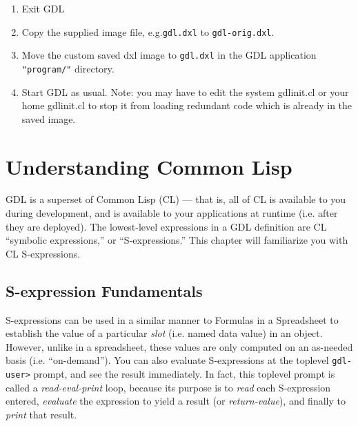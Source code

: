 \documentclass [11pt]{book}
\begin{document}
\begin{enumerate}

\item Exit GDL

\item Copy the supplied image file, e.g.\texttt{gdl.dxl} to \texttt{gdl-orig.dxl}.

\item Move the custom saved dxl image to \texttt{gdl.dxl} in the GDL application \texttt{"program/"} directory.

\item Start GDL as usual. Note: you may have to edit the system gdlinit.cl or your home gdlinit.cl
to stop it from loading redundant code which is already in the saved image.

\end{enumerate}



\chapter{Understanding Common Lisp}

\label{chap:understandingcommonlisp}



GDL is a superset of Common Lisp (CL) --- that is, all of
CL is available to you during development, and is available to your
applications at runtime (i.e. after they are deployed). The
lowest-level expressions in a GDL definition are CL ``symbolic
expressions,'' or ``S-expressions.''  This chapter will familiarize
you with CL S-expressions.



\section{S-expression Fundamentals}

\label{sec:s-expressionfundamentals}



S-expressions can be used in a similar manner to Formulas
in a Spreadsheet to establish the value of a particular \emph{slot} (i.e. named data value) in an object. However, unlike in
a spreadsheet, these values are only computed on an as-needed
basis (i.e. ``on-demand''). You can also evaluate S-expressions at the
toplevel \texttt{gdl-user\textgreater} prompt, and see the result immediately. In fact, this toplevel prompt is called a \emph{read-eval-print} loop, because its purpose is to \emph{read} each S-expression  entered, \emph{evaluate} the expression to yield a result (or \emph{return-value}), and finally to \emph{print} that result.
\end{document}
